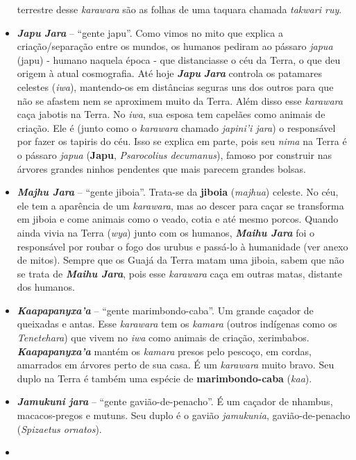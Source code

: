 \begin{itemize}
  terrestre desse \emph{karawara} são as folhas de uma taquara chamada
  \emph{takwari ruy}.
\item
  \textbf{\emph{Japu} \emph{Jara}} -- ``gente japu''. Como vimos no mito
  que explica a criação/separação entre os mundos, os humanos pediram ao
  pássaro \emph{japua} (japu) - humano naquela época - que distanciasse
  o céu da Terra, o que deu origem à atual cosmografia. Até hoje
  \emph{\textbf{Japu}} \emph{\textbf{Jara}} controla os patamares
  celestes (\emph{iwa}), mantendo-os em distâncias seguras uns dos
  outros para que não se afastem nem se aproximem muito da Terra. Além
  disso esse \emph{karawara} caça jabotis na Terra. No \emph{iwa}, sua
  esposa tem capelães como animais de criação. Ele é (junto como o
  \emph{karawara} chamado \emph{japini'i jara}) o responsável por fazer
  os tapiris do céu. Isso se explica em parte, pois seu \emph{nima} na
  Terra é o pássaro \emph{japua} (\textbf{Japu}, \emph{Psarocolius
  decumanus}), famoso por construir nas árvores grandes ninhos pendentes
  que mais parecem grandes bolsas.
\item
  \emph{\textbf{Majhu Jara}} -- ``gente jiboia''. Trata-se da
  \textbf{jiboia} (\emph{majhua}) celeste. No céu, ele tem a aparência
  de um \emph{karawara}, mas ao descer para caçar se transforma em
  jiboia e come animais como o veado, cotia e até mesmo porcos. Quando
  ainda vivia na Terra (\emph{wya}) junto com os humanos,
  \emph{\textbf{Maihu Jara}} foi o responsável por roubar o fogo dos
  urubus e passá-lo à humanidade (ver anexo de mitos). Sempre que os
  Guajá da Terra matam uma jiboia, sabem que não se trata de
  \emph{\textbf{Maihu Jara}}, pois esse \emph{karawara} caça em outras
  matas, distante dos humanos.
\item
  \emph{\textbf{Kaapapanyxa'a}} -- ``gente marimbondo-caba''. Um grande
  caçador de queixadas e antas. Esse \emph{karawara} tem os
  \emph{kamara} (outros indígenas como os \emph{Tenetehara}) que vivem
  no \emph{iwa} como animais de criação, xerimbabos.
  \emph{\textbf{Kaapapanyxa'a}} mantém os \emph{kamara} presos pelo
  pescoço, em cordas, amarrados em árvores perto de sua casa. É um
  \emph{karawara} muito bravo. Seu duplo na Terra é também uma espécie
  de \textbf{marimbondo-caba} (\emph{kaa}).
\item
  \textbf{\emph{Jamukuni jara}} -- ``gente gavião-de-penacho''. É um
  caçador de nhambus, macacos-pregos e mutuns. Seu duplo é o gavião
  \emph{jamukunia}, gavião-de-penacho (\emph{Spizaetus ornatos}).
\item

\end{itemize}
